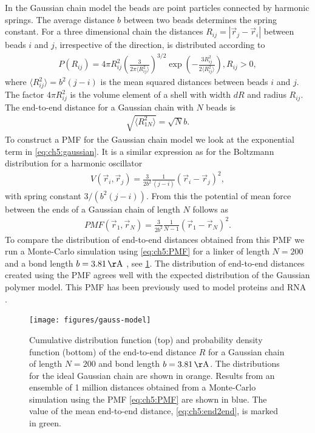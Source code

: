 \documentclass[12pt, twoside]{report}
\begin{document}
In the Gaussian chain model the beads are point particles connected by harmonic
springs. The average distance \(b\) between two beads determines the spring
constant. For a three dimensional chain the distances $R_{ij} = |\vec{r}_j -
\vec{r}_i|$ between beads \(i\) and \(j\), irrespective of the direction, is
distributed according to \cite{yamakawa1971modern}
\begin{align}
\label{eq:ch5:gaussian} P(R_{ij}) = 4 \pi R_{ij}^2 \left(\frac{3}{2\pi \langle
R^2_{ij}\rangle}\right)^{3/2} \exp\left(-\frac{3R_{ij}^2}{2 \langle
R_{ij}^2\rangle}\right) , R_{ij} > 0,
\end{align} where \(\langle R^2_{ij}\rangle = b^2(j-i)\) is the mean squared
distances between beads \(i\) and \(j\). The factor \(4 \pi R_{ij}^2\) is the
volume element of a shell with width \(dR\) and radius \(R_{ij}\). The
end-to-end distance for a Gaussian chain with $N$ beads is
\begin{align}
\label{eq:ch5:end2end} \sqrt{\langle R^2_{1N}\rangle} = \sqrt{N}b.
\end{align} To construct a \gls{PMF} for the Gaussian chain model we look at the
exponential term in \cref{eq:ch5:gaussian}. It is a similar expression as for
the Boltzmann distribution for a harmonic oscillator
\begin{align}
  \label{eq:ch5:harmonic-oscillator} V(\vec{r}_i, \vec{r}_j) =
\frac{3}{2b^2}\frac{1}{(j-i)}(\vec{r}_i - \vec{r}_j)^2,
\end{align} with spring constant $3/(b^2(j-i))$. From this the potential of mean
force between the ends of a Gaussian chain of length $N$ follows as
\begin{align}
  \label{eq:ch5:PMF} PMF(\vec{r}_1, \vec{r}_N) = \frac{3}{2 b^2} \frac{1}{N-1}
(\vec{r}_1 - \vec{r}_N)^2.
\end{align} To compare the distribution of end-to-end distances obtained from
this \gls{PMF} we run a Monte-Carlo simulation using \cref{eq:ch5:PMF} for a
linker of length \(N=200\) and a bond length \(b=\SI{3.81}{\AA}\)
\cite{Best2005}, see \cref{fig:gauss-model}. The distribution of end-to-end
distances created using the PMF agrees well with the expected distribution of
the Gaussian polymer model. This \gls{PMF} has been previously used to model
proteins and \gls{RNA} \cite{Hyeon2008}.
\begin{figure}[!ht]
  \centering
\texttt{[image: figures/gauss-model]}
\caption[Cumulative distribution function and probability density function of
the end-to-end distance $R$ for a Gaussian chain.]{Cumulative distribution
  function (top) and probability density function (bottom) of the end-to-end
  distance $R$ for a Gaussian chain of length $N=200$ and bond length
  $b=\SI{3.81}{\AA}$. The distributions for the ideal Gaussian chain are shown
  in orange. Results from an ensemble of 1 million distances obtained from a
  Monte-Carlo simulation using the PMF \cref{eq:ch5:PMF} are shown in blue. The
  value of the mean end-to-end distance, \cref{eq:ch5:end2end}, is marked in
  green.}
\label{fig:gauss-model}
\end{figure}
\end{document}

